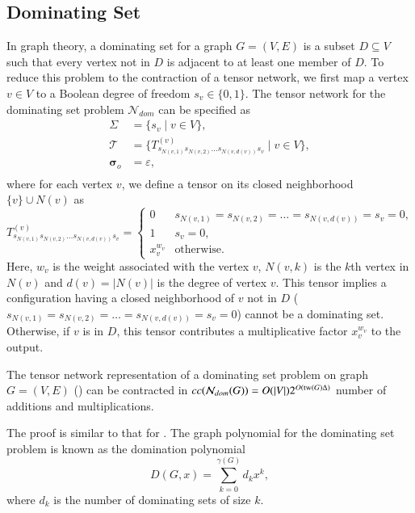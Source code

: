 \documentclass[review, onefignum, onetabnum]{siamart190516}
\begin{document}
\subsection{Dominating Set}
In graph theory, a dominating set for a graph $G = (V, E)$ is a subset $D \subseteq V$ such that every vertex not in $D$ is adjacent to at least one member of $D$.
To reduce this problem to the contraction of a tensor network, we first map a vertex $v\in V$ to a Boolean degree of freedom $s_v\in\{0, 1\}$.
The tensor network for the dominating set problem $\mathcal{N}_{dom}$ can be specified as
\begin{equation}\label{eq:domtensornetwork}
\begin{split}
    \Sigma &= \{s_v \mid v \in V\},\\
    \mathcal{T} &= \{T^{(v)}_{s_{N(v,1)}s_{N(v, 2)} \ldots s_{N(v,d(v))} s_v} \mid v\in V\},\\
    \boldsymbol{\sigma}_o &= \varepsilon,\\
\end{split}
\end{equation}
where for each vertex $v$, we define a tensor on its closed neighborhood $\{v\} \cup N(v)$ as
\begin{equation}
T^{(v)}_{s_{N(v, 1)}s_{N(v, 2)}\ldots s_{N(v, d(v))}s_v} = \begin{cases}
    0 & s_{N(v, 1)}=s_{N(v, 2)}=\ldots=s_{N(v, d(v))}=s_v=0,\\
    1 & s_v=0,\\
    x^{w_v}_v & \text{otherwise}.
\end{cases}
\end{equation}
Here, $w_v$ is the weight associated with the vertex $v$, $N(v, k)$ is the $k$th vertex in $N(v)$ and $d(v) = |N(v)|$ is the degree of vertex $v$.
This tensor implies a configuration having a closed neighborhood of $v$ not in $D$ ($s_{N(v, 1)}=s_{N(v, 2)}=\ldots=s_{N(v, d(v))}=s_v=0$) cannot be a dominating set.
Otherwise, if $v$ is in $D$, this tensor contributes a multiplicative factor $x_v^{w_v}$ to the output. 
\begin{theorem}\label{thm:domcomplex}
    The tensor network representation of a dominating set problem on graph $G=(V,E)$ () can be contracted in $cc(\mathcal{N}_{dom}(G)) = O(|V|)2^{O({\rm tw}(G)\Delta)}$ number of additions and multiplications.
\end{theorem}
The proof is similar to that for .
The graph polynomial for the dominating set problem is known as the domination polynomial~\cite{Alikhani2009}
\begin{equation}
D(G, x) = \sum_{k=0}^{\gamma(G)} d_k x^k,
\end{equation}
where $d_k$ is the number of dominating sets of size $k$.
\end{document}
